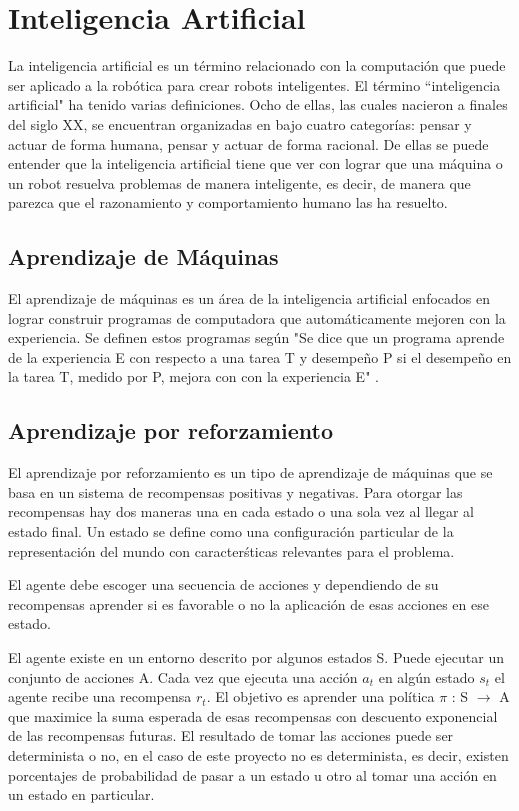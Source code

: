 \section{Inteligencia Artificial} \label{sect:Inteligencia_Artificial}
La inteligencia artificial es un término relacionado con la computación que puede ser aplicado a la robótica para crear robots inteligentes. El término ``inteligencia artificial"\:
 ha tenido varias definiciones. Ocho de ellas, las cuales nacieron a finales del siglo XX, se encuentran organizadas en \cite{peterNorvig} bajo cuatro categorías: pensar y actuar de forma humana, pensar y actuar de forma racional. De ellas se puede entender que la inteligencia artificial tiene que ver con lograr que una máquina o un robot resuelva problemas de manera inteligente, es decir, de manera que parezca que el razonamiento y comportamiento humano las ha resuelto.  

\subsection{Aprendizaje de Máquinas}

El aprendizaje de máquinas es un área de la inteligencia artificial enfocados en lograr construir programas de computadora que automáticamente mejoren con la experiencia. Se definen estos programas seg\'un \cite{Mitchell} "Se dice que un programa aprende de la experiencia E con respecto a una tarea T y desempeño P si el desempeño en la tarea T, medido por P, mejora con con la experiencia E" .

\subsection{Aprendizaje por reforzamiento}
El aprendizaje por reforzamiento es un tipo de aprendizaje de máquinas que se basa en un sistema de recompensas positivas y negativas. Para otorgar las recompensas hay dos maneras una en cada estado o una sola vez al llegar al estado final. Un estado se define como una configuraci\'on particular de la representaci\'on del mundo con caracter\'sticas relevantes para el problema.

El agente debe escoger una secuencia de acciones y dependiendo de su recompensas aprender si es favorable o no la aplicaci\'on de esas acciones en ese estado.

El agente existe en un entorno descrito por algunos estados S. Puede ejecutar un conjunto de acciones A. Cada vez que ejecuta una acción $a_t$ en algún estado $s_t$ el agente recibe una recompensa $r_t$. El objetivo es aprender una política $\pi$ : S $\to$ A que maximice la suma esperada de esas recompensas con descuento exponencial de las recompensas futuras. \cite{Mitchell} El resultado de tomar las acciones puede ser determinista o no, en el caso de este proyecto no es determinista, es decir, existen porcentajes de probabilidad de pasar a un estado u otro al tomar una acción en un estado en particular.
  
